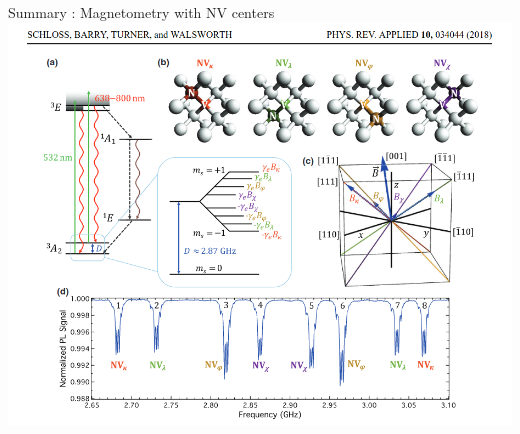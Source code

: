 \documentclass{beamer}
\begin{document}
\begin{frame}{Summary : Magnetometry with NV centers}
\centering
\includegraphics[scale=.4]{ESR_8raies_article}
\end{frame}
\end{document}
